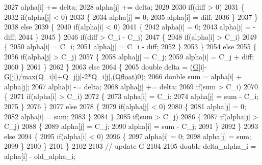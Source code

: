 \begin{DoxyCode}
2027       alpha[i] += delta;
2028       alpha[j] += delta;
2029 
2030       \textcolor{keywordflow}{if}(diff > 0)
2031       \{
2032         \textcolor{keywordflow}{if}(alpha[j] < 0)
2033         \{
2034           alpha[j] = 0;
2035           alpha[i] = diff;
2036         \}
2037       \}
2038       \textcolor{keywordflow}{else}
2039       \{
2040         \textcolor{keywordflow}{if}(alpha[i] < 0)
2041         \{
2042           alpha[i] = 0;
2043           alpha[j] = -diff;
2044         \}
2045       \}
2046       \textcolor{keywordflow}{if}(diff > C\_i - C\_j)
2047       \{
2048         \textcolor{keywordflow}{if}(alpha[i] > C\_i)
2049         \{
2050           alpha[i] = C\_i;
2051           alpha[j] = C\_i - diff;
2052         \}
2053       \}
2054       \textcolor{keywordflow}{else}
2055       \{
2056         \textcolor{keywordflow}{if}(alpha[j] > C\_j)
2057         \{
2058           alpha[j] = C\_j;
2059           alpha[i] = C\_j + diff;
2060         \}
2061       \}
2062     \}
2063     \textcolor{keywordflow}{else}
2064     \{
2065       \textcolor{keywordtype}{double} delta = (\hyperlink{class_s_v_m233_1_1_solver_a429fc1d5724c8e7547e02b74cac19f40}{G}[i]-\hyperlink{class_s_v_m233_1_1_solver_a429fc1d5724c8e7547e02b74cac19f40}{G}[j])/\hyperlink{namespace_s_v_m233_af89e72ffe29dd42949c494bc4ec751e6}{max}(Q\_i[i]+Q\_j[j]-2*Q\_i[j],(\hyperlink{namespace_s_v_m289___m_f_s_a440663a1b8d42bc10329401883645ae1}{Qfloat})0);
2066       \textcolor{keywordtype}{double} sum = alpha[i] + alpha[j];
2067       alpha[i] -= delta;
2068       alpha[j] += delta;
2069       \textcolor{keywordflow}{if}(sum > C\_i)
2070       \{
2071         \textcolor{keywordflow}{if}(alpha[i] > C\_i)
2072         \{
2073           alpha[i] = C\_i;
2074           alpha[j] = sum - C\_i;
2075         \}
2076       \}
2077       \textcolor{keywordflow}{else}
2078       \{
2079         \textcolor{keywordflow}{if}(alpha[j] < 0)
2080         \{
2081           alpha[j] = 0;
2082           alpha[i] = sum;
2083         \}
2084       \}
2085       \textcolor{keywordflow}{if}(sum > C\_j)
2086       \{
2087         \textcolor{keywordflow}{if}(alpha[j] > C\_j)
2088         \{
2089           alpha[j] = C\_j;
2090           alpha[i] = sum - C\_j;
2091         \}
2092       \}
2093       \textcolor{keywordflow}{else}
2094       \{
2095         \textcolor{keywordflow}{if}(alpha[i] < 0)
2096         \{
2097           alpha[i] = 0;
2098           alpha[j] = sum;
2099         \}
2100       \}
2101     \}
2102 
2103     \textcolor{comment}{// update G}
2104 
2105     \textcolor{keywordtype}{double} delta\_alpha\_i = alpha[i] - old\_alpha\_i;

\end{DoxyCode}
